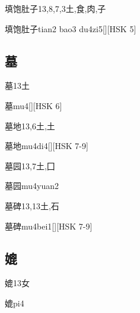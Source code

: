 \begin{Entry}{填饱肚子}{13,8,7,3}{⼟,⾷,⾁,⼦}
  \begin{Phonetics}{填饱肚子}{tian2 bao3 du4zi5}[][HSK 5]
  \end{Phonetics}
\end{Entry}

\subsection*{墓}

\begin{Entry}{墓}{13}{⼟}
  \begin{Phonetics}{墓}{mu4}[][HSK 6]
  \end{Phonetics}
\end{Entry}

\begin{Entry}{墓地}{13,6}{⼟,⼟}
  \begin{Phonetics}{墓地}{mu4di4}[][HSK 7-9]
  \end{Phonetics}
\end{Entry}

\begin{Entry}{墓园}{13,7}{⼟,⼞}
  \begin{Phonetics}{墓园}{mu4yuan2}
  \end{Phonetics}
\end{Entry}

\begin{Entry}{墓碑}{13,13}{⼟,⽯}
  \begin{Phonetics}{墓碑}{mu4bei1}[][HSK 7-9]
  \end{Phonetics}
\end{Entry}

\subsection*{媲}

\begin{Entry}{媲}{13}{⼥}
  \begin{Phonetics}{媲}{pi4}
  \end{Phonetics}
\end{Entry}

